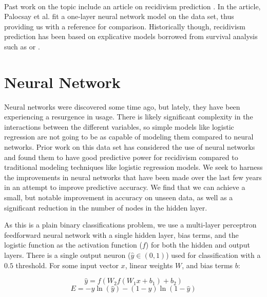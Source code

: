 \documentclass[a0,landscape]{a0poster}
\begin{document}
\begin{multicols}{4}
\paragraph{}
Past work on the topic include an article on recidivism prediction \cite{bib1}. In the article, Palocsay et al. fit a one-layer neural network model on the data set, thus providing us with a reference for comparison. Historically though, recidivism prediction has been based on explicative models borrowed from survival analysis such as \cite{bib2} or \cite{bib3}.


\color{DarkSlateGray} %

\section*{Neural Network}
Neural networks were discovered some time ago, but lately, they have been experiencing a resurgence in usage. There is likely significant complexity in the interactions between the different variables, so simple models like logistic regression are not going to be as capable of modeling them compared to neural networks. Prior work on this data set has considered the use of neural networks and found them to have good predictive power for recidivism compared to traditional modeling techniques like logistic regression models. We seek to harness the improvements in neural networks that have been made over the last few years in an attempt to improve predictive accuracy. We find that we can achieve a small, but notable improvement in accuracy on unseen data, as well as a significant reduction in the number of nodes in the hidden layer.

As this is a plain binary classifications problem, we use a multi-layer perceptron feedforward neural network with a single hidden layer, bias terms, and the logistic function as the activation function ($f$) for both the hidden and output layers. There is a single output neuron ($\hat{y} \in (0, 1)$) used for classification with a $0.5$ threshold. For some input vector $x$, linear weights $W$, and bias terms $b$:

\[ \hat{y} = f( W_2  f( W_1 x + b_1 ) + b_2 ) \]
\[ E = - y \ln( \hat{y} ) - (1 - y) \ln ( 1 - \hat{y} ) \]


\end{multicols}
\end{document}
